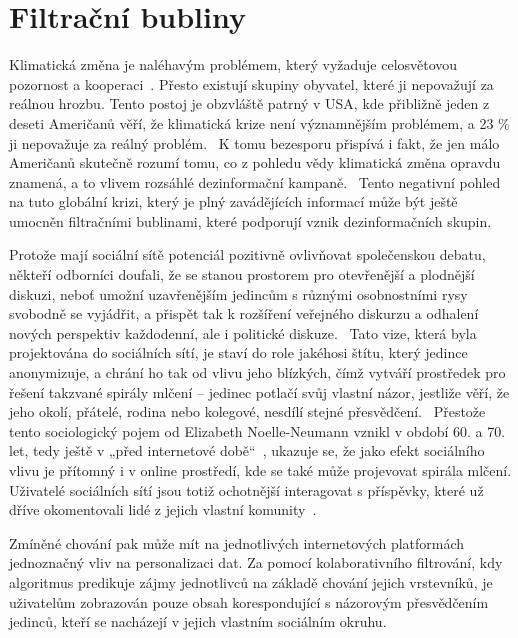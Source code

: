 \chapter{Filtrační bubliny}
\label{chapter:filtracni-bubliny}
    Klimatická změna je naléhavým problémem, který vyžaduje celosvětovou pozornost a kooperaci~\citep{stokes2015global}. Přesto existují skupiny obyvatel, které ji nepovažují za reálnou hrozbu. Tento postoj je obzvláště patrný v USA, kde přibližně jeden z deseti Američanů věří, že klimatická krize není významnějším problémem, a 23 \% ji nepovažuje za reálný problém.~\citep{fagan_huang_2020} K tomu bezesporu přispívá i fakt, že jen málo Američanů skutečně rozumí tomu, co z pohledu vědy klimatická změna opravdu znamená, a to vlivem rozsáhlé dezinformační kampaně.~\citep{kolmes2011climate} Tento negativní pohled na tuto globální krizi, který je plný zavádějících informací může být ještě umocněn filtračními bublinami, které podporují vznik dezinformačních skupin.~\citep{Bruns}
    
    Protože mají sociální sítě potenciál pozitivně ovlivňovat společenskou debatu, někteří odborníci doufali, že se stanou prostorem pro otevřenější a plodnější diskuzi, neboť umožní uzavřenějším jedincům s různými osobnostními rysy svobodně se vyjádřit, a přispět tak k rozšíření veřejného diskurzu a odhalení nových perspektiv každodenní, ale i politické diskuze.~\citep{hampton} 
    Tato vize, která byla projektována do sociálních sítí, je staví do role jakéhosi štítu, který jedince anonymizuje, a chrání ho tak od vlivu jeho blízkých, čímž vytváří prostředek pro řešení takzvané spirály mlčení – jedinec potlačí svůj vlastní názor, jestliže věří, že jeho okolí, přátelé, rodina nebo kolegové, nesdílí stejné přesvědčení.~\citep{Noelle} 
    Přestože tento sociologický pojem od Elizabeth Noelle-Neumann vznikl v období 60. a 70. let, tedy ještě v „před internetové době“~\citep{Petersen}, ukazuje se, že jako efekt sociálního vlivu je přítomný i v online prostředí, kde se také může projevovat spirála mlčení. Uživatelé sociálních sítí jsou totiž ochotnější interagovat s příspěvky, které už dříve okomentovali lidé z jejich vlastní komunity~\citep{Nasim}.
    
    
    Zmíněné chování pak může mít na jednotlivých internetových platformách jednoznačný vliv na personalizaci dat. Za pomocí kolaborativního filtrování, kdy algoritmus predikuje zájmy jednotlivců na základě chování jejich vrstevníků, je uživatelům zobrazován pouze obsah korespondující s názorovým přesvědčením jedinců, kteří se nacházejí v jejich vlastním sociálním okruhu.~\citep{Claypool1999CombiningCA}
    
